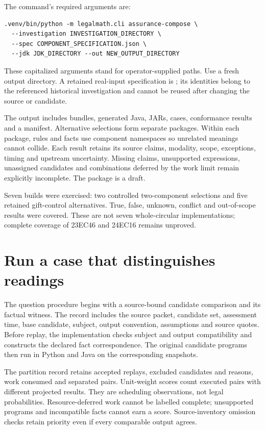 The command's required arguments are:
\begin{lstlisting}
.venv/bin/python -m legalmath.cli assurance-compose \
  --investigation INVESTIGATION_DIRECTORY \
  --spec COMPONENT_SPECIFICATION.json \
  --jdk JDK_DIRECTORY --out NEW_OUTPUT_DIRECTORY
\end{lstlisting}
These capitalized arguments stand for operator-supplied paths. Use a fresh
output directory. A retained real-input specification is
;
its identities belong to the referenced historical investigation and cannot
be reused after changing the source or candidate.

The output includes bundles, generated Java, JARs, cases, conformance results
and a manifest. Alternative selections form separate packages. Within each
package, rules and facts use component namespaces so unrelated meanings cannot
collide. Each result retains its source claims, modality, scope, exceptions,
timing and upstream uncertainty. Missing claims, unsupported expressions,
unassigned candidates and combinations deferred by the work limit remain
explicitly incomplete. The package is a draft.

Seven builds were exercised: two controlled two-component selections and five
retained gift-control alternatives. True, false, unknown, conflict and
out-of-scope results were covered. These are not seven whole-circular
implementations; complete coverage of 23EC46 and 24EC16 remains unproved.

\section{Run a case that distinguishes readings}

The question procedure begins with a source-bound candidate comparison and its
factual witness. The record includes the source packet, candidate set, assessment
time, base candidate, subject, output convention, assumptions and source quotes.
Before replay, the implementation checks subject and output compatibility and
constructs the declared fact correspondence. The original candidate programs
then run in Python and Java on the corresponding snapshots.

The partition record retains accepted replays, excluded candidates and reasons,
work consumed and separated pairs. Unit-weight scores count executed pairs
with different projected results. They are scheduling observations, not legal
probabilities. Resource-deferred work cannot be labelled complete; unsupported
programs and incompatible facts cannot earn a score. Source-inventory omission
checks retain priority even if every comparable output agrees.

